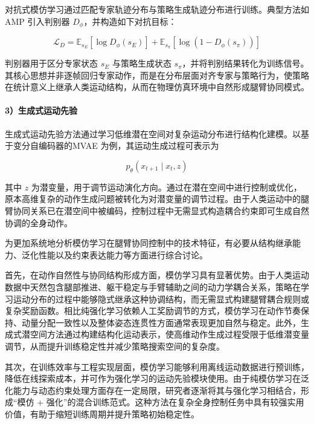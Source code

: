 对抗式模仿学习通过匹配专家轨迹分布与策略生成轨迹分布进行训练。典型方法如 AMP \cite{AMP} 引入判别器 $D_\phi$，并构造如下对抗目标：

\begin{equation}
	\mathcal{L}_D =
	\mathbb{E}_{s_E}[\log D_\phi(s_E)] +
	\mathbb{E}_{s_\pi}[\log (1 - D_\phi(s_\pi))]
\end{equation}

判别器用于区分专家状态 $s_E$ 与策略生成状态 $s_\pi$，并将判别结果转化为训练信号。其核心思想并非逐帧回归专家动作，而是在分布层面对齐专家与策略行为，使策略在统计意义上继承人类运动结构，从而在物理仿真环境中自然形成腿臂协同模式。

\paragraph{3）生成式运动先验}

生成式运动先验方法通过学习低维潜在空间对复杂运动分布进行结构化建模。以基于变分自编码器的MVAE\cite{MVAE} 为例，其运动生成过程可表示为

\begin{equation}
	p_\theta(x_{t+1} \mid x_t, z)
\end{equation}

其中 $z$ 为潜变量，用于调节运动演化方向。通过在潜在空间中进行控制或优化，原本高维复杂的动作生成问题被转化为对潜变量的调节过程。由于人类运动中的腿臂协同关系已在潜空间中被编码，控制过程中无需显式构造耦合约束即可生成自然协调的全身动作。


为更加系统地分析模仿学习在腿臂协同控制中的技术特征，有必要从结构继承能力、泛化性能以及约束表达能力等方面进行综合讨论。

首先，在动作自然性与协同结构形成方面，模仿学习具有显著优势。由于人类运动数据中天然包含腿部推进、躯干稳定与手臂辅助之间的动力学耦合关系，策略在学习运动分布的过程中能够隐式继承这种协调结构，而无需显式构建腿臂耦合规则或复杂奖励函数。相比纯强化学习依赖人工奖励调节的方式，模仿学习在动作节奏保持、动量分配一致性以及整体姿态连贯性方面通常表现更加自然与稳定。此外，生成式潜空间方法通过构建结构化运动表示，使高维动作生成过程受限于低维潜变量调节，从而提升训练稳定性并减少策略搜索空间的复杂度。

其次，在训练效率与工程实现层面，模仿学习能够利用离线运动数据进行预训练，降低在线探索成本，并可作为强化学习的运动先验模块使用。由于纯模仿学习在泛化能力与动态约束处理方面存在一定局限，研究者逐渐将其与强化学习相结合，形成“模仿 + 强化”的混合训练范式。这种方法在复杂全身控制任务中具有较强实用价值，有助于缩短训练周期并提升策略初始稳定性。

